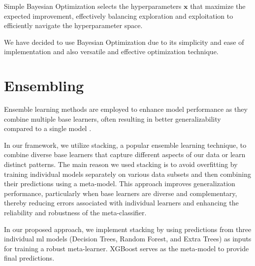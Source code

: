 Simple Bayesian Optimization selects the hyperparameters $\boldsymbol{x}$ that maximize the expected improvement, effectively balancing exploration and exploitation to efficiently navigate the hyperparameter space.

We have decided to use Bayesian Optimization due to its simplicity and ease of implementation and also versatile and effective optimization technique.


\section{Ensembling}

Ensemble learning methods are employed to enhance model performance as they combine multiple base learners, often resulting in better generalizability compared to a single model \cite{mohammed2018using}.

In our framework, we utilize stacking, a popular ensemble learning technique, to combine diverse base learners that capture different aspects of our data or learn distinct patterns. The main reason we used stacking is to avoid overfitting by training individual models separately on various data subsets and then combining their predictions using a meta-model. This approach improves generalization performance, particularly when base learners are diverse and complementary, thereby reducing errors associated with individual learners and enhancing the reliability and robustness of the meta-classifier.

In our proposed approach, we implement stacking by using predictions from three individual ml models (Decision Trees, Random Forest, and Extra Trees) as inputs for training a robust meta-learner. XGBoost serves as the meta-model to provide final predictions. 

